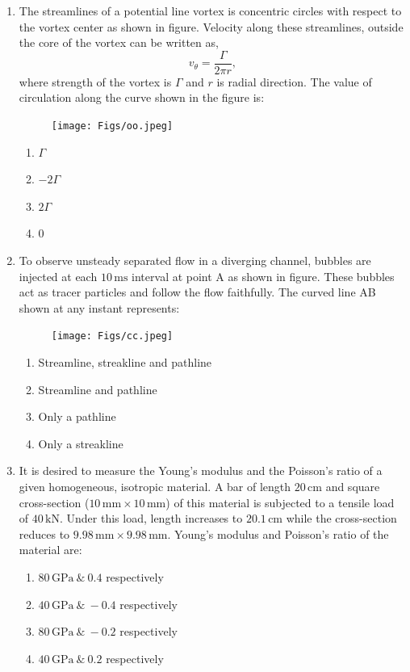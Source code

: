\documentclass[journal]{IEEEtran}
\begin{document}
\begin{enumerate}
\item The streamlines of a potential line vortex is concentric circles with respect to the vortex center as shown in figure. Velocity along these streamlines, outside the core of the vortex can be written as,
$$
v_{\theta} = \frac{\Gamma}{2 \pi r},
$$
where strength of the vortex is $\Gamma$ and $r$ is radial direction. The value of circulation along the curve shown in the figure is:

\begin{figure}[H]
\centering
\texttt{[image: Figs/oo.jpeg]}
\caption{}
\end{figure}
\begin{enumerate}
    \item $\Gamma$
    \item $-2\Gamma$
    \item $2\Gamma$
    \item $0$
\end{enumerate}
\hfill{}

\item To observe unsteady separated flow in a diverging channel, bubbles are injected at each $10\,\mathrm{ms}$ interval at point A as shown in figure. These bubbles act as tracer particles and follow the flow faithfully. The curved line AB shown at any instant represents:
\begin{figure}[H]
\centering
\texttt{[image: Figs/cc.jpeg]}
\caption{}
\end{figure}
\begin{enumerate}
    \item Streamline, streakline and pathline
    \item Streamline and pathline
    \item Only a pathline
    \item Only a streakline
\end{enumerate}
\hfill{}

\item It is desired to measure the Young's modulus and the Poisson's ratio of a given homogeneous, isotropic material. A bar of length $20\,\mathrm{cm}$ and square cross-section ($10\,\mathrm{mm} \times 10\,\mathrm{mm}$) of this material is subjected to a tensile load of $40\,\mathrm{kN}$. Under this load, length increases to $20.1\,\mathrm{cm}$ while the cross-section reduces to $9.98\,\mathrm{mm} \times 9.98\,\mathrm{mm}$. Young's modulus and Poisson's ratio of the material are:

\begin{enumerate}
    \item $80\,\mathrm{GPa} \ \& \ 0.4$ respectively
    \item $40\,\mathrm{GPa} \ \& \ -0.4$ respectively
    \item $80\,\mathrm{GPa} \ \& \ -0.2$ respectively
    \item $40\,\mathrm{GPa} \ \& \ 0.2$ respectively
\end{enumerate}
\hfill{}


\end{enumerate}
\end{document}
